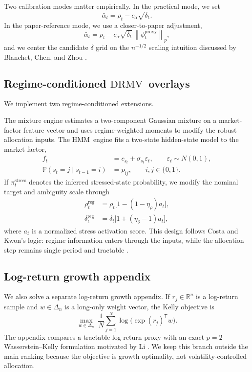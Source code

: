 \documentclass[11pt]{article}
\newcommand{\Prob}{\mathbb{P}}
\newcommand{\R}{\mathbb{R}}
\newcommand{\norm}[1]{\left\lVert #1 \right\rVert}
\newcommand{\transpose}{\mathsf{T}}
\newcommand{\DRMV}{\ensuremath{\mathrm{DRMV}}}
\newcommand{\HMM}{\ensuremath{\mathrm{HMM}}}
\begin{document}
Two calibration modes matter empirically. In the practical mode, we set
\begin{equation}
\bar\alpha_t = \rho_t - c_\alpha\sqrt{\delta_t}.
\end{equation}
In the paper-reference mode, we use a closer-to-paper adjustment,
\begin{equation}
\bar\alpha_t = \rho_t - c_\alpha\sqrt{\delta_t}\,\norm{\phi_t^{\mathrm{proxy}}}_p,
\end{equation}
and we center the candidate $\delta$ grid on the $n^{-1/2}$ scaling intuition discussed by Blanchet, Chen, and Zhou \cite{BlanchetChenZhou2022}.

\subsection{Regime-conditioned \DRMV\ overlays}

We implement two regime-conditioned extensions.

The mixture engine estimates a two-component Gaussian mixture on a market-factor feature vector and uses regime-weighted moments to modify the robust allocation inputs. The \HMM\ engine fits a two-state hidden-state model to the market factor,
\begin{align}
f_t &= c_{s_t}+\sigma_{s_t}\varepsilon_t,
\qquad \varepsilon_t\sim N(0,1),
\\
\Prob(s_t=j\mid s_{t-1}=i)&=p_{ij},
\qquad i,j\in\{0,1\}.
\end{align}
If $\pi_t^{\mathrm{stress}}$ denotes the inferred stressed-state probability, we modify the nominal target and ambiguity scale through
\begin{align}
\rho_t^{\mathrm{reg}} &= \rho_t\bigl[1-(1-\eta_\rho)a_t\bigr],
\\
\delta_t^{\mathrm{reg}} &= \delta_t\bigl[1+(\eta_\delta-1)a_t\bigr],
\end{align}
where $a_t$ is a normalized stress activation score. This design follows Costa and Kwon's logic: regime information enters through the inputs, while the allocation step remains single period and tractable \cite{CostaKwon2020}.

\subsection{Log-return growth appendix}

We also solve a separate log-return growth appendix. If $r_j\in\R^n$ is a log-return sample and $w\in\Delta_n$ is a long-only weight vector, the Kelly objective is
\begin{equation}
\max_{w\in\Delta_n}\; \frac{1}{N}\sum_{j=1}^N \log\bigl(\exp(r_j)^\transpose w\bigr).
\end{equation}
The appendix compares a tractable log-return proxy with an exact-$p=2$ Wasserstein--Kelly formulation motivated by Li \cite{Li2023}. We keep this branch outside the main ranking because the objective is growth optimality, not volatility-controlled allocation.
\end{document}
